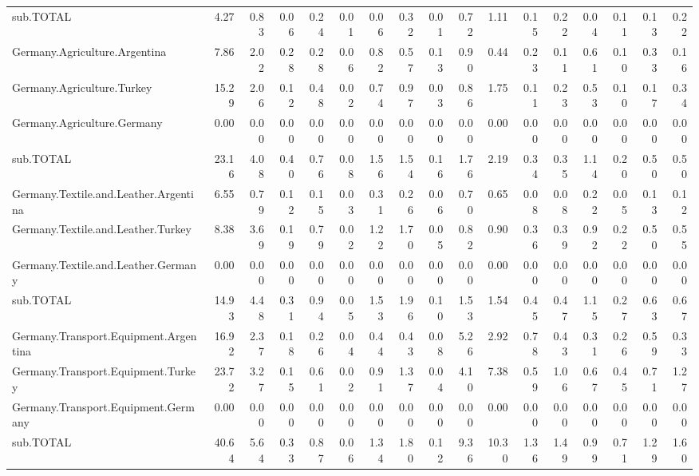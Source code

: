 \documentclass[a4paper,11pt]{article}
\begin{document}
\begin{sidewaystable}[htbp]
\begin{tabular}{lrrrrrrrrrrrrrrrr}
    sub.TOTAL & 4.27  & 0.83  & 0.06  & 0.24  & 0.01  & 0.06  & 0.32  & 0.01  & 0.72  & 1.11  & 0.15  & 0.22  & 0.04  & 0.11  & 0.13  & 0.22 \\
    Germany.Agriculture.Argentina & 7.86  & 2.02  & 0.28  & 0.28  & 0.06  & 0.82  & 0.57  & 0.13  & 0.90  & 0.44  & 0.23  & 0.11  & 0.61  & 0.10  & 0.33  & 0.16 \\
    Germany.Agriculture.Turkey & 15.29 & 2.06  & 0.12  & 0.48  & 0.02  & 0.74  & 0.97  & 0.03  & 0.86  & 1.75  & 0.11  & 0.23  & 0.53  & 0.10  & 0.17  & 0.34 \\
    Germany.Agriculture.Germany & 0.00  & 0.00  & 0.00  & 0.00  & 0.00  & 0.00  & 0.00  & 0.00  & 0.00  & 0.00  & 0.00  & 0.00  & 0.00  & 0.00  & 0.00  & 0.00 \\
    sub.TOTAL & 23.16 & 4.08  & 0.40  & 0.76  & 0.08  & 1.56  & 1.54  & 0.16  & 1.76  & 2.19  & 0.34  & 0.35  & 1.14  & 0.20  & 0.50  & 0.50 \\
    Germany.Textile.and.Leather.Argentina & 6.55  & 0.79  & 0.12  & 0.15  & 0.03  & 0.31  & 0.26  & 0.06  & 0.70  & 0.65  & 0.08  & 0.08  & 0.22  & 0.05  & 0.13  & 0.12 \\
    Germany.Textile.and.Leather.Turkey & 8.38  & 3.69  & 0.19  & 0.79  & 0.02  & 1.22  & 1.70  & 0.05  & 0.82  & 0.90  & 0.36  & 0.39  & 0.92  & 0.22  & 0.50  & 0.55 \\
    Germany.Textile.and.Leather.Germany & 0.00  & 0.00  & 0.00  & 0.00  & 0.00  & 0.00  & 0.00  & 0.00  & 0.00  & 0.00  & 0.00  & 0.00  & 0.00  & 0.00  & 0.00  & 0.00 \\
    sub.TOTAL & 14.93 & 4.48  & 0.31  & 0.94  & 0.05  & 1.53  & 1.96  & 0.10  & 1.53  & 1.54  & 0.45  & 0.47  & 1.15  & 0.27  & 0.63  & 0.67 \\
    Germany.Transport.Equipment.Argentina & 16.92 & 2.37  & 0.18  & 0.26  & 0.04  & 0.44  & 0.43  & 0.08  & 5.26  & 2.92  & 0.78  & 0.43  & 0.31  & 0.26  & 0.59  & 0.33 \\
    Germany.Transport.Equipment.Turkey & 23.72 & 3.27  & 0.15  & 0.61  & 0.02  & 0.91  & 1.37  & 0.04  & 4.10  & 7.38  & 0.59  & 1.06  & 0.67  & 0.45  & 0.71  & 1.27 \\
    Germany.Transport.Equipment.Germany & 0.00  & 0.00  & 0.00  & 0.00  & 0.00  & 0.00  & 0.00  & 0.00  & 0.00  & 0.00  & 0.00  & 0.00  & 0.00  & 0.00  & 0.00  & 0.00 \\
    sub.TOTAL & 40.64 & 5.64  & 0.33  & 0.87  & 0.06  & 1.34  & 1.80  & 0.12  & 9.36  & 10.30 & 1.36  & 1.49  & 0.99  & 0.71  & 1.29  & 1.60 \\
   \bottomrule
    \end{tabular}
\end{sidewaystable}
\end{document}
